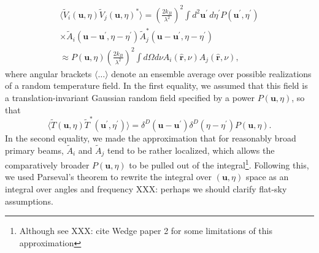 \documentclass[twocolumn,apj,numberedappendix]{emulateapj}
\newcommand{\rhat}{\hat{\mathbf{r}}}
\begin{document}
\begin{eqnarray}
\label{eq:visCrossCorr}
\langle \widetilde{V}_i(\mathbf{u},\eta) \widetilde{V}_j(\mathbf{u},\eta)^*\rangle = \left( \frac{2 k_B}{\lambda^2} \right)^2 \int d^2 \mathbf{u}^\prime \, d\eta^\prime  P(\mathbf{u}^\prime , \eta^\prime) \nonumber \\
\times \widetilde{A}_i (\mathbf{u} -\mathbf{u}^\prime, \eta-\eta^\prime) \widetilde{A}_j^* (\mathbf{u} -\mathbf{u}^\prime, \eta-\eta^\prime) \nonumber \\
\approx P(\mathbf{u} , \eta) \left( \frac{2 k_B}{\lambda^2} \right)^2 \int d\Omega d\nu A_i (\rhat,\nu) A_j (\rhat,\nu), \quad
\end{eqnarray}
where angular brackets $\langle \dots \rangle$ denote an ensemble average over possible realizations of a random temperature field. In the first equality, we assumed that this field is a translation-invariant Gaussian random field specified by a power $P(\mathbf{u}, \eta)$, so that
\begin{equation}
\langle \widetilde{T}(\mathbf{u} , \eta) \widetilde{T}^*(\mathbf{u}^\prime , \eta^\prime)\rangle = \delta^{D} (\mathbf{u} - \mathbf{u}^\prime) \delta^D (\eta - \eta^\prime) P(\mathbf{u}, \eta).
\end{equation}
In the second equality, we made the approximation that for reasonably broad primary beams, $\widetilde{A}_i $ and $\widetilde{A}_j$ tend to be rather localized, which allows the comparatively broader $P(\mathbf{u}, \eta)$ to be pulled out of the integral\footnote{Although see XXX: cite Wedge paper 2 for some limitations of this approximation}. Following this, we used Parseval's theorem to rewrite the integral over $(\mathbf{u},\eta)$ space as an integral over angles and frequency XXX: perhaps we should clarify flat-sky assumptions.
\end{document}
